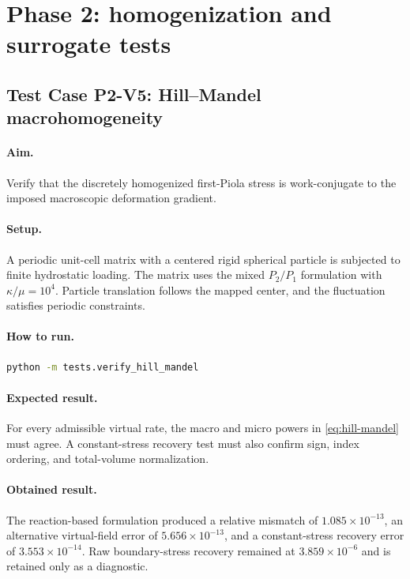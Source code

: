 \section{Phase 2: homogenization and surrogate tests}

\subsection*{Test Case P2-V5: Hill--Mandel macrohomogeneity}

\paragraph{Aim.}
Verify that the discretely homogenized first-Piola stress is work-conjugate to
the imposed macroscopic deformation gradient.

\paragraph{Setup.}
A periodic unit-cell matrix with a centered rigid spherical particle is
subjected to finite hydrostatic loading. The matrix uses the mixed
\(P_2/P_1\) formulation with \(\kappa/\mu=10^4\). Particle translation follows
the mapped center, and the fluctuation satisfies periodic constraints.

\paragraph{How to run.}
\begin{lstlisting}[language=bash]
python -m tests.verify_hill_mandel
\end{lstlisting}

\paragraph{Expected result.}
For every admissible virtual rate, the macro and micro powers in
\cref{eq:hill-mandel} must agree. A constant-stress recovery test must also
confirm sign, index ordering, and total-volume normalization.

\paragraph{Obtained result.}
The reaction-based formulation produced a relative mismatch of
\(1.085\times10^{-13}\), an alternative virtual-field error of
\(5.656\times10^{-13}\), and a constant-stress recovery error of
\(3.553\times10^{-14}\). Raw boundary-stress recovery remained at
\(3.859\times10^{-6}\) and is retained only as a diagnostic.

